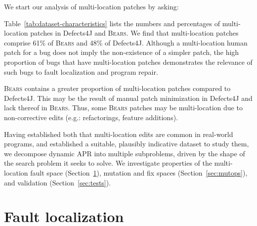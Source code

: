 \documentclass[10pt, conference]{IEEEtran}
\newcommand\bears{\textsc{Bears}\xspace}
\begin{document}
We start our analysis of multi-location patches by asking:


Table~\ref{tab:dataset-characteristics} lists the numbers and percentages of
multi-location patches in Defects4J and \bears. 
We find that multi-location patches comprise 61\% of \bears and 48\% of 
Defects4J.
Although a multi-location human patch for a bug does not imply the 
non-existence of a simpler patch, the high proportion of bugs that have 
multi-location patches demonstrates the relevance of such bugs to fault localization and
program repair. 

\bears contains a greater proportion of 
multi-location patches compared to Defects4J. This may be the 
result of manual patch minimization in Defects4J
and lack thereof in \bears.
Thus, some \bears patches may be multi-location due to
non-corrective edits (e.g.: refactorings, feature additions).

Having established both that multi-location edits are common in real-world
programs, and established a suitable, plausibly indicative dataset to study
them, we decompose dynamic APR into multiple subproblems, driven by the
shape of the search problem it seeks to solve. We 
investigate properties of the multi-location fault space (Section~\ref{secFL}),
mutation and fix spaces (Section~\ref{sec:mutops}), and validation
(Section~\ref{sec:tests}). 

\section{Fault localization} \label{secFL}

\end{document}
